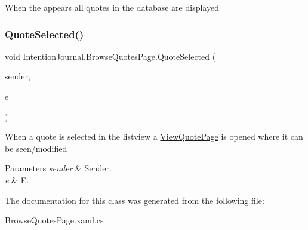 When the appears all quotes in the database are displayed 

\mbox{\label{class_intention_journal_1_1_browse_quotes_page_ab67be25647d0a7f8cc371d88d39c4411}} 
\subsubsection{\texorpdfstring{Quote\+Selected()}{QuoteSelected()}}
{\footnotesize\ttfamily void Intention\+Journal.\+Browse\+Quotes\+Page.\+Quote\+Selected (\begin{DoxyParamCaption}\item[{object}]{sender,  }\item[{Selected\+Item\+Changed\+Event\+Args}]{e }\end{DoxyParamCaption})\hspace{0.3cm}{\ttfamily [inline]}}



When a quote is selected in the listview a \hyperlink{class_intention_journal_1_1_view_quote_page}{View\+Quote\+Page} is opened where it can be seen/modified 


\begin{DoxyParams}{Parameters}
{\em sender} & Sender.\\
\hline
{\em e} & E.\\
\hline
\end{DoxyParams}


The documentation for this class was generated from the following file\+:\begin{DoxyCompactItemize}
\item 
Browse\+Quotes\+Page.\+xaml.\+cs\end{DoxyCompactItemize}
